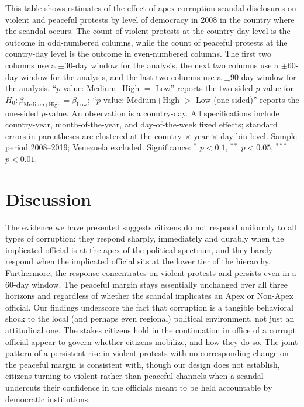 \documentclass[11pt]{article}
\let\mathbetasym\beta
\renewcommand{\beta}{\ensuremath{\mathbetasym}}
\begin{document}
\begin{table}[htb!]
    \caption{Effects on violent mobilization are larger in more democratic countries}
    \label{tab:sup_democracy_lmh}
    \begin{center}
        \scriptsize{}
    \end{center}
    \footnotesize{This table shows estimates of the effect of apex corruption scandal disclosures on violent and peaceful protests by level of democracy in 2008 in the country where the scandal occurs. The count of violent protests at the country-day level is the outcome in odd-numbered columns, while the count of peaceful protests at the country-day level is the outcome in even-numbered columns. The first two columns use a $\pm30$-day window for the analysis, the next two columns use a $\pm60$-day window for the analysis, and the last two columns use a $\pm90$-day window for the analysis. ``$p$-value: Medium+High $=$ Low'' reports the two-sided $p$-value for $H_0:\beta_{\text{Medium+High}}=\beta_{\text{Low}}$; ``$p$-value: Medium+High $>$ Low (one-sided)'' reports the one-sided $p$-value. An observation is a country-day. All specifications include country-year, month-of-the-year, and day-of-the-week fixed effects; standard errors in parentheses are clustered at the country $\times$ year $\times$ day-bin level. Sample period 2008--2019; Venezuela excluded. Significance: $^{*}$ $p<0.1$, $^{**}$ $p<0.05$, $^{***}$ $p<0.01$.}
\end{table}

\section{Discussion}
The evidence we have presented suggests citizens do not respond uniformly to all types of corruption: they respond sharply, immediately and durably when the implicated official is at the apex of the political spectrum, and they barely respond when the implicated official sits at the lower tier of the hierarchy. Furthermore, the response concentrates on violent protests and persists even in a 60-day window. The peaceful margin stays essentially unchanged over all three horizons and regardless of whether the scandal implicates an Apex or Non-Apex official. Our findings underscore the fact that corruption is a tangible behavioral shock to the local (and perhaps even regional) political environment, not just an attitudinal one. The stakes citizens hold in the continuation in office of a corrupt official appear to govern whether citizens mobilize, and how they do so. The joint pattern of a persistent rise in violent protests with no corresponding change on the peaceful margin is consistent with, though our design does not establish, citizens turning to violent rather than peaceful channels when a scandal undercuts their confidence in the officials meant to be held accountable by democratic institutions.
\end{document}
